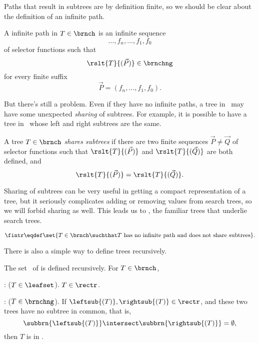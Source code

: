 \begin{definition}
Paths that result in subtrees are by definition finite, so we should
be clear about the definition of an infinite path.

\begin{definition}
A infinite path in $T \in \brnch$ is an infinite sequence
\[
\dots,f_n,\dots,f_1,f_0
\]
of selector functions such that
\[
\rslt{T}{(\vec{P})} \in \brnchng
\]
for every finite suffix
\[
\vec{P} = (f_n,\dots, f_1,f_0).
\]
\end{definition}

But there's still a problem.  Even if they
have no infinite paths, a tree in \brnch\ may have some unexpected
\emph{sharing} of subtrees.  For example, it is possible to have a
tree in \brnch\ whose left and right subtrees are the same.



\begin{definition}
A tree $T \in \brnch$ \emph{shares subtrees} if there are two finite
sequences $\vec{P} \neq \vec{Q}$ of selector functions such that
$\rslt{T}{(\vec{P})}$ and $\rslt{T}{(\vec{Q})}$ are both defined, and
\[
\rslt{T}{(\vec{P})}=\rslt{T}{(\vec{Q})}.
\]
\end{definition}
Sharing of subtrees can be very useful in getting a compact
representation of a tree, but it seriously complicates adding or
removing values from search trees, so we will forbid sharing as well.
This leads us to \fintr, the familiar trees that underlie search
trees.
\begin{definition}
\[
\fintr \eqdef \set{T \in \brnch \suchthat T\ \text{has no infinite path and
  does not share subtrees}}.
\]
\end{definition}

There is also a simple way to define trees recursively.

\begin{definition}\label{def:rectree}
The set \rectr\ of  is defined recursively.  For
$T \in \brnch$,

: ($T \in \leafset$).  $T \in \rectr$.

: ($T \in \brnchng$).
If $\leftsub{(T)}, \rightsub{(T)} \in \rectr$, and these two trees
have no subtree in common, that is,
\[
\subbrn{\leftsub{(T)}} \intersect \subbrn{\rightsub{(T)}} = \emptyset,
\]
then $T$ is in \rectr.
\end{definition}


\end{definition}
